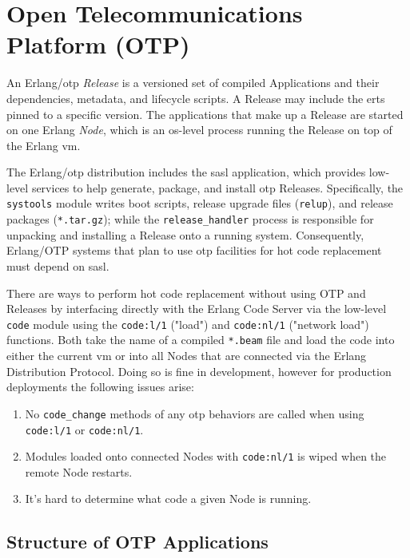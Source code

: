 \chapter{Open Telecommunications Platform (OTP)}


An Erlang/\acrshort{otp} \emph{Release} is a versioned set of compiled Applications and their dependencies, metadata, and lifecycle scripts. A Release may include the \acrfull{erts} pinned to a specific version. The applications that make up a Release are started on one Erlang \emph{Node}, which is an \acrshort{os}-level process running the Release on top of the Erlang \acrshort{vm}.

The Erlang/\acrshort{otp} distribution includes the \acrfull{sasl} application, which provides low-level services to help generate, package, and install \acrshort{otp} Releases. Specifically, the \lstinline|systools| module writes boot scripts, release upgrade files (\lstinline|relup|), and release packages (\lstinline|*.tar.gz|); while the \lstinline|release_handler| process is responsible for unpacking and installing a Release onto a running system. Consequently, Erlang/OTP systems that plan to use \acrshort{otp} facilities for hot code replacement must depend on \acrshort{sasl}.


There are ways to perform hot code replacement without using OTP and Releases by interfacing directly with the Erlang Code Server via the low-level \lstinline|code| module using the \lstinline|code:l/1| ("load") and \lstinline|code:nl/1| ("network load") functions. Both take the name of a compiled \lstinline|*.beam| file and load the code into either the current \acrshort{vm} or into all Nodes that are connected via the Erlang Distribution Protocol. Doing so is fine in development, however for production deployments the following issues arise:

\begin{enumerate}
\item No \lstinline|code_change| methods of any \acrshort{otp} behaviors are called when using \lstinline|code:l/1| or \lstinline|code:nl/1|.
\item Modules loaded onto connected Nodes with \lstinline|code:nl/1| is wiped when the remote Node restarts.
\item It's hard to determine what code a given Node is running.
\end{enumerate}


\section{Structure of OTP Applications}

